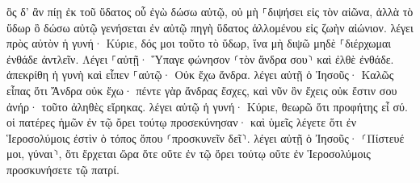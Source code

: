 \documentclass{openreader}
\begin{document}
ὃς δ’ ἂν πίῃ ἐκ τοῦ ὕδατος οὗ ἐγὼ δώσω αὐτῷ, οὐ μὴ ⸀διψήσει εἰς τὸν αἰῶνα, ἀλλὰ τὸ ὕδωρ ὃ δώσω αὐτῷ γενήσεται ἐν αὐτῷ πηγὴ ὕδατος ἁλλομένου εἰς ζωὴν αἰώνιον. 
λέγει πρὸς αὐτὸν ἡ γυνή· Κύριε, δός μοι τοῦτο τὸ ὕδωρ, ἵνα μὴ διψῶ μηδὲ ⸀διέρχωμαι ἐνθάδε ἀντλεῖν. 
Λέγει ⸀αὐτῇ· Ὕπαγε φώνησον ⸂τὸν ἄνδρα σου⸃ καὶ ἐλθὲ ἐνθάδε. 
ἀπεκρίθη ἡ γυνὴ καὶ εἶπεν ⸀αὐτῷ· Οὐκ ἔχω ἄνδρα. λέγει αὐτῇ ὁ Ἰησοῦς· Καλῶς εἶπας ὅτι Ἄνδρα οὐκ ἔχω· 
πέντε γὰρ ἄνδρας ἔσχες, καὶ νῦν ὃν ἔχεις οὐκ ἔστιν σου ἀνήρ· τοῦτο ἀληθὲς εἴρηκας. 
λέγει αὐτῷ ἡ γυνή· Κύριε, θεωρῶ ὅτι προφήτης εἶ σύ. 
οἱ πατέρες ἡμῶν ἐν τῷ ὄρει τούτῳ προσεκύνησαν· καὶ ὑμεῖς λέγετε ὅτι ἐν Ἱεροσολύμοις ἐστὶν ὁ τόπος ὅπου ⸂προσκυνεῖν δεῖ⸃. 
λέγει αὐτῇ ὁ Ἰησοῦς· ⸂Πίστευέ μοι, γύναι⸃, ὅτι ἔρχεται ὥρα ὅτε οὔτε ἐν τῷ ὄρει τούτῳ οὔτε ἐν Ἱεροσολύμοις προσκυνήσετε τῷ πατρί. 
\end{document}
